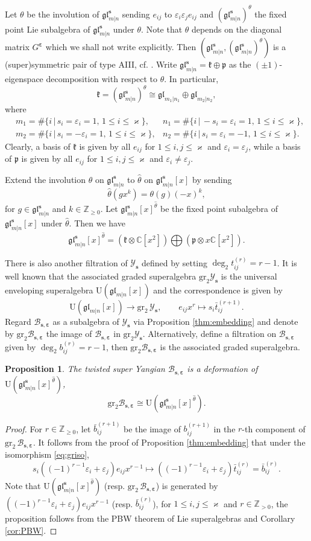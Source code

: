 \documentclass[11pt,reqno]{amsart}
\numberwithin{equation}{section}
\newtheorem{prop}[thm]{Proposition}
\theoremstyle{definition}
\theoremstyle{remark}
\newcommand{\beq}{\begin{equation}}
\newcommand{\eeq}{\end{equation}}
\newcommand{\C}{\mathbb{C}}
\newcommand{\Z}{\mathbb{Z}}
\newcommand{\gl}{\mathfrak{gl}}
\newcommand{\bZ}{\mathbb{Z}}
\newcommand{\gge}{\geqslant}
\newcommand{\lle}{\leqslant}
\newcommand{\glMN}{\mathfrak{gl}_{m|n}^{\bm s}}
\newcommand{\YMN}{{\mathscr{Y}_{\bm s}}}
\newcommand{\BMN}{{\mathscr{B}_{\bm s,\bm \ve}}}
\newcommand{\ka}{\varkappa}
\newcommand{\ve}{\varepsilon}
\begin{document}
Let $\theta$ be the involution of $\glMN$ sending $e_{ij}$ to $\ve_i\ve_j e_{ij}$ and $(\glMN)^\theta$ the fixed point Lie subalgebra of $\glMN$ under $\theta$. Note that $\theta$ depends on the diagonal matrix $G^{\bm\ve}$ which we shall not write explicitly. Then $(\glMN,(\glMN)^\theta)$ is a (super)symmetric pair of type AIII, cf. \cite{Shen2025quantum}. Write $\glMN=\mathfrak k\oplus\mathfrak p$ as the $(\pm 1)$-eigenspace decomposition with respect to $\theta$. In particular,
$$
\mathfrak k=(\glMN)^\theta\cong \gl_{m_1|n_1}\oplus \gl_{m_2|n_2},
$$
where
\begin{align*}
   &m_1=\#\{i\,|\, s_i=\ve_i=1,\, 1\lle i\lle \ka\},&n_1=\#\{i\,|\, -s_i=\ve_i=1,\, 1\lle i\lle \ka\},\\
   &m_2=\#\{i\,|\, s_i=-\ve_i=1,\, 1\lle i\lle \ka\},& n_2=\#\{i\,|\, s_i=\ve_i=-1,\, 1\lle i\lle \ka\}.
\end{align*}
Clearly, a basis of $\mathfrak k$ is given by all $e_{ij}$ for $1\lle i,j\lle\ka$ and $\ve_i=\ve_j$, while a basis of $\mathfrak p$ is given by all $e_{ij}$ for $1\lle i,j\lle\ka$ and $\ve_i\ne\ve_j$.

Extend the involution $\theta$ on $\glMN$ to $\hat\theta$ on $\glMN[x]$ by sending
$$
\hat\theta(gx^k)=\theta(g)(-x)^k,
$$
for $g\in \glMN$ and $k\in\Z_{\gge 0}$. Let $\glMN[x]^{\hat\theta}$ be the fixed point subalgebra of $\glMN[x]$ under $\hat\theta$. Then we have
\[
\glMN[x]^{\hat\theta}=(\mathfrak k\otimes \C[x^2]) \bigoplus (\mathfrak p\otimes x\C[x^2]).
\]

There is also another filtration of $\YMN$ defined by setting $\deg_2 t_{ij}^{(r)}=r-1$. It is well known \cite{Gow2007gauss} that the associated graded superalgebra $\mathrm{gr}_2\YMN$ is the universal enveloping superalgebra $\mathrm{U}(\gl_{m|n}[x])$ and the correspondence is given by
\beq\label{eq:griso}
\mathrm{U}(\gl_{m|n}[x])\to \mathrm{gr}_2\,\YMN, \qquad e_{ij} x^r\mapsto s_i\bar{t}_{ij}^{(r+1)}.
\eeq
Regard $\BMN$ as a subalgebra of $\YMN$ via Proposition \ref{thm:embedding} and denote by $\mathrm{gr}_2 \BMN$ the image of $\BMN$ in $\mathrm{gr}_2\YMN$. Alternatively, define a filtration on $\BMN$ given by $\deg_2 b_{ij}^{(r)}=r-1$, then $\mathrm{gr}_2\BMN$ is the associated graded superalgebra.
\begin{prop}\label{prop:limit}
The twisted super Yangian $\BMN$ is a deformation of $\mathrm{U}(\glMN[x]^{\hat\theta})$,
\[
\mathrm{gr}_2 \BMN\cong \mathrm{U}(\glMN[x]^{\hat\theta}).
\]
\end{prop}
\begin{proof}
For $r\in\Z_{\gge 0}$, let $\bar b_{ij}^{(r+1)}$ be the image of $b_{ij}^{(r+1)}$ in the $r$-th component of $\mathrm{gr}_2\,\BMN$. It follows from the proof of Proposition \ref{thm:embedding} that under the isomorphism \eqref{eq:griso},
\[
s_i((-1)^{r-1}\ve_i+\ve_j)e_{ij}x^{r-1}\mapsto ((-1)^{r-1}\ve_i+\ve_j)\bar{t}_{ij}^{(r)}=\bar b_{ij}^{(r)}.
\]
Note that $\mathrm{U}(\glMN[x]^{\hat\theta})$ (resp. $\mathrm{gr}_2\,\BMN$) is generated by $((-1)^{r-1}\ve_i+\ve_j)e_{ij}x^{r-1}$ (resp. $\bar b_{ij}^{(r)}$), for $1\lle i,j\lle \ka$ and $r\in\bZ_{>0}$, the proposition follows from the PBW theorem of Lie superalgebras and Corollary \ref{cor:PBW}.
\end{proof}
\end{document}
